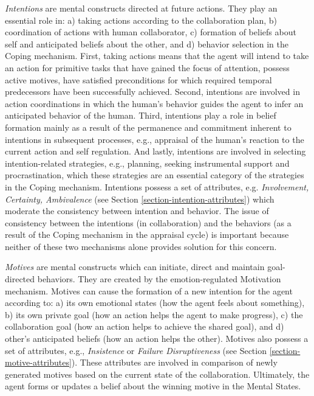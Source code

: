 \documentclass[12pt]{report}
\begin{document}
\textit{Intentions} are mental constructs directed at future actions. They play
an essential role in: a) taking actions according to the collaboration plan, b)
coordination of actions with human collaborator, c) formation of beliefs about
self and anticipated beliefs about the other, and d) behavior selection in the
Coping mechanism. First, taking actions means that the agent will intend to take
an action for primitive tasks that have gained the focus of attention, possess
active motives, have satisfied preconditions for which required temporal
predecessors have been successfully achieved. Second, intentions are involved
in action coordinations in which the human's behavior guides the agent to infer
an anticipated behavior of the human. Third, intentions play a role in belief
formation mainly as a result of the permanence and commitment inherent to
intentions in subsequent processes, e.g., appraisal of the human's reaction to
the current action and self regulation. And lastly, intentions are involved in
selecting intention-related strategies, e.g., planning, seeking instrumental
support and procrastination, which these strategies are an essential category of
the strategies in the Coping mechanism. Intentions possess a set of attributes,
e.g. \textit{Involvement, Certainty, Ambivalence} (see Section
\ref{section-intention-attributes}) which moderate the consistency between
intention and behavior. The issue of consistency between the intentions (in
collaboration) and the behaviors (as a result of the Coping mechanism in the
appraisal cycle) is important because neither of these two mechanisms alone
provides solution for this concern.

\textit{Motives} are mental constructs which can initiate, direct and maintain
goal-directed behaviors. They are created by the emotion-regulated Motivation
mechanism. Motives can cause the formation of a new intention for the agent
according to: a) its own emotional states (how the agent feels about something),
b) its own private goal (how an action helps the agent to make progress), c) the
collaboration goal (how an action helps to achieve the shared goal), and d)
other's anticipated beliefs (how an action helps the other). Motives also
possess a set of attributes, e.g., \textit{Insistence} or \textit{Failure
Disruptiveness} (see Section \ref{section-motive-attributes}). These attributes
are involved in comparison of newly generated motives based on the current state
of the collaboration. Ultimately, the agent forms or updates a belief about the
winning motive in the Mental States.
\end{document}
